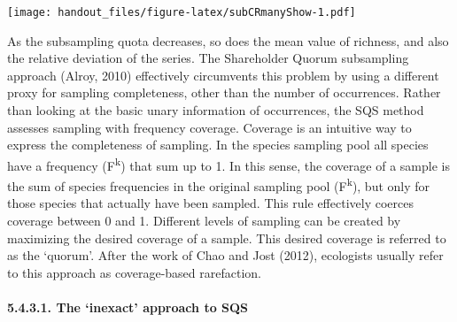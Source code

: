 \documentclass[]{article}
\newenvironment{Shaded}{\begin{snugshade}}{\end{snugshade}}
\newcommand{\ControlFlowTok}[1]{\textcolor[rgb]{0.13,0.29,0.53}{\textbf{#1}}}
\newcommand{\DataTypeTok}[1]{\textcolor[rgb]{0.13,0.29,0.53}{#1}}
\newcommand{\DecValTok}[1]{\textcolor[rgb]{0.00,0.00,0.81}{#1}}
\newcommand{\KeywordTok}[1]{\textcolor[rgb]{0.13,0.29,0.53}{\textbf{#1}}}
\newcommand{\NormalTok}[1]{#1}
\newcommand{\OperatorTok}[1]{\textcolor[rgb]{0.81,0.36,0.00}{\textbf{#1}}}
\newcommand{\StringTok}[1]{\textcolor[rgb]{0.31,0.60,0.02}{#1}}
\let\oldparagraph\paragraph
\renewcommand{\paragraph}[1]{\oldparagraph{#1}\mbox{}}
\begin{document}
\begin{Shaded}
\end{Shaded}

\texttt{[image: handout\_files/figure-latex/subCRmanyShow-1.pdf]}

As the subsampling quota decreases, so does the mean value of richness,
and also the relative deviation of the series. The Shareholder Quorum
subsampling approach (Alroy, 2010) effectively circumvents this problem
by using a different proxy for sampling completeness, other than the
number of occurrences. Rather than looking at the basic unary
information of occurrences, the SQS method assesses sampling with
frequency coverage. Coverage is an intuitive way to express the
completeness of sampling. In the species sampling pool all species have
a frequency (F\textsuperscript{k}) that sum up to 1. In this sense, the
coverage of a sample is the sum of species frequencies in the original
sampling pool (F\textsuperscript{k}), but only for those species that
actually have been sampled. This rule effectively coerces coverage
between 0 and 1. Different levels of sampling can be created by
maximizing the desired coverage of a sample. This desired coverage is
referred to as the `quorum'. After the work of Chao and Jost (2012),
ecologists usually refer to this approach as coverage-based rarefaction.

\hypertarget{the-inexact-approach-to-sqs}{%
\paragraph{5.4.3.1. The `inexact' approach to
SQS}\label{the-inexact-approach-to-sqs}}
\end{document}
